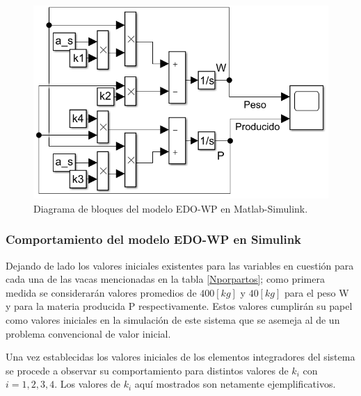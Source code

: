 \begin{figure}[H]
	 \begin{center}
	 \includegraphics[scale=0.69]{img/simulinkwp1.png}
	 \end{center}
	 \caption{Diagrama de bloques del modelo EDO-WP en Matlab-Simulink. \label{modbloques}}
\end{figure}

\pagebreak
\subsubsection{Comportamiento del modelo EDO-WP en Simulink} \label{simulwp}

Dejando de lado los valores iniciales existentes para las variables en cuestión para cada una de las vacas mencionadas en la tabla \ref{Nporpartos}; como primera medida se considerarán valores promedios de $400[kg]$ y $40[kg]$ para el peso W y para la materia producida P respectivamente. Estos valores cumplirán su papel como valores iniciales en la simulación de este sistema que se asemeja al de un problema convencional de valor inicial.

Una vez establecidas los valores iniciales de los elementos integradores del sistema se procede a observar su comportamiento para distintos valores de $k_{i}$ con $i=1,2,3,4$. Los valores de $k_{i}$ aquí mostrados son netamente ejemplificativos.

